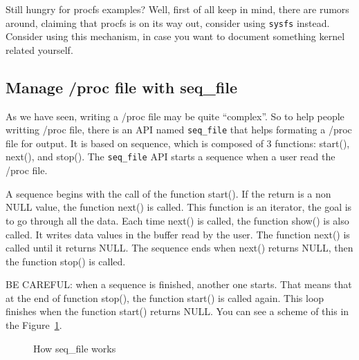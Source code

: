 \documentclass[10pt, oneside]{book}
\begin{document}
Still hungry for procfs examples?
Well, first of all keep in mind, there are rumors around, claiming that procfs is on its way out, consider using \verb|sysfs| instead.
Consider using this mechanism, in case you want to document something kernel related yourself.

\subsection{Manage /proc file with seq\_file}
\label{sec:manage_procfs_with_seq_file}
As we have seen, writing a /proc file may be quite ``complex''.
So to help people writting /proc file, there is an API named \verb|seq_file| that helps formating a /proc file for output.
It is based on sequence, which is composed of 3 functions: start(), next(), and stop().
The \verb|seq_file| API starts a sequence when a user read the /proc file.

A sequence begins with the call of the function start().
If the return is a non NULL value, the function next() is called.
This function is an iterator, the goal is to go through all the data.
Each time next() is called, the function show() is also called.
It writes data values in the buffer read by the user.
The function next() is called until it returns NULL.
The sequence ends when next() returns NULL, then the function stop() is called.

BE CAREFUL: when a sequence is finished, another one starts.
That means that at the end of function stop(), the function start() is called again.
This loop finishes when the function start() returns NULL.
You can see a scheme of this in the Figure~\ref{img:seqfile}.

\begin{figure}
  \center
  \caption{How seq\_file works}
  \label{img:seqfile}
\end{figure}
\end{document}
